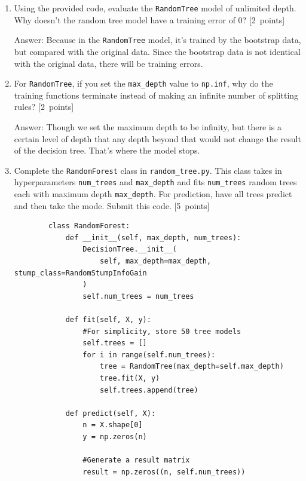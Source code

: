 \documentclass{article}
\newcommand{\blu}[1]{{\textcolor{blu}{#1}}}
\newenvironment{answer}{\par\begingroup\color{gre}Answer: }{\endgroup}
\let\ask\blu
\newcommand\pts[1]{\textcolor{pointscolour}{[#1~points]}}
\begin{document}
    \begin{enumerate}
        \item Using the provided code, evaluate the \texttt{RandomTree} model of unlimited depth. \ask{Why doesn't the random tree model have a training error of 0?} \pts{2}
        \begin{answer}
            Because in the \texttt{RandomTree} model, it's trained by the bootstrap data, but compared with the original data. Since the bootstrap data is not identical with the original data, there will be training errors.
        \end{answer}
        \item For \texttt{RandomTree}, if you set the \texttt{max\_depth} value to \texttt{np.inf}, \ask{why do the training functions terminate instead of making an infinite number of splitting rules?} \pts{2}
        \begin{answer}
            Though we set the maximum depth to be infinity, but there is a certain level of depth that any depth beyond that would not change the result of the decision tree. That's where the model stops.
        \end{answer}
        \item Complete the \texttt{RandomForest} class in \texttt{random\string_tree.py}. This class takes in hyperparameters \texttt{num\string_trees} and \texttt{max\string_depth} and
        fits \texttt{num\string_trees} random trees each with maximum depth \texttt{max\string_depth}. For prediction, have all trees predict and then take the mode. \ask{Submit this code.} \pts{5}
        \begin{verbatim}
        class RandomForest:
            def __init__(self, max_depth, num_trees):
                DecisionTree.__init__(
                    self, max_depth=max_depth, stump_class=RandomStumpInfoGain
                )
                self.num_trees = num_trees

            def fit(self, X, y):
                #For simplicity, store 50 tree models
                self.trees = []
                for i in range(self.num_trees):
                    tree = RandomTree(max_depth=self.max_depth)
                    tree.fit(X, y)
                    self.trees.append(tree)
                    
            def predict(self, X):
                n = X.shape[0]
                y = np.zeros(n)

                #Generate a result matrix
                result = np.zeros((n, self.num_trees))


\end{verbatim}
\end{enumerate}
\end{document}
